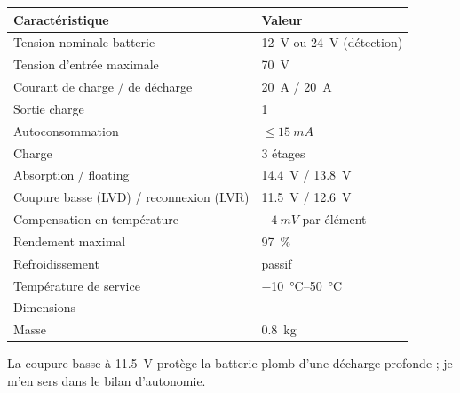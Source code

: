 \noindent
\begin{table}[H]
\centering
\begin{tabularx}{\linewidth}{lY}
\hline
Caractéristique & Valeur \\
\hline
Tension nominale batterie & \qty{12}{V} ou \qty{24}{V} (détection) \\
Tension d'entrée maximale & \qty{70}{V} \\
Courant de charge / de décharge & \qty{20}{A} / \qty{20}{A} \\
Sortie charge & 1 \\
Autoconsommation & $\leq \qty{15}{mA}$ \\
Charge & 3 étages \\
Absorption / floating & \qty{14,4}{V} / \qty{13,8}{V} \\
Coupure basse (LVD) / reconnexion (LVR) & \qty{11,5}{V} / \qty{12,6}{V} \\
Compensation en température & $-\qty{4}{mV}$ par élément \\
Rendement maximal & \qty{97}{\percent} \\
Refroidissement & passif \\
Température de service & \qtyrange{-10}{50}{\celsius} \\
Dimensions &  \\
Masse & \qty{0,8}{kg} \\
\hline
\end{tabularx}
\end{table}
La coupure basse à \qty{11,5}{V} protège la batterie plomb d'une décharge profonde ; je m'en sers dans le bilan d'autonomie.

